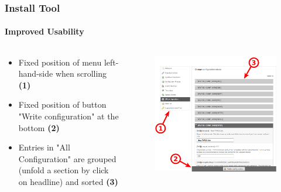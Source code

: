 
\begin{frame}[fragile]
	\frametitle{Install Tool}
	\framesubtitle{Improved Usability}

	\begin{columns}[T]
		\begin{column}{.5\textwidth}

			\begin{itemize}
				\item Fixed position of menu left-\newline
					hand-side when scrolling
					\begingroup\color{typo3red}\textbf{(1)}\endgroup
				\item Fixed position of button "Write configuration" at the bottom
					\begingroup\color{typo3red}\textbf{(2)}\endgroup
				\item Entries in "All Configuration" are grouped (unfold a section by click on headline) and sorted
					\begingroup\color{typo3red}\textbf{(3)}\endgroup
			\end{itemize}

		\end{column}
		\begin{column}{.5\textwidth}

			\begin{figure}\vspace*{-0.4cm}
				\includegraphics[width=0.8\linewidth]{Images/InstallTool/ImprovedUsability.png}
			\end{figure}

		\end{column}
	\end{columns}

\end{frame}

